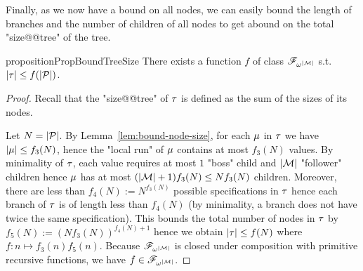 Finally, as we now have a bound on all nodes, we can easily bound the length of branches and the number of children of all nodes to get abound on the total "size@@tree" of the tree.

\begin{restatable}{proposition}{PropBoundTreeSize}
	\label{prop:bound-tree-size}
	There exists a function $f$ of class $\mathscr{F}_{\omega^{|\mathcal{M}|}}$ s.t. $|\tau| \leq f(|\mathcal{P}|)$.
\end{restatable}

\begin{proof}
	Recall that the "size@@tree" of $\tau$ is defined as the sum of the sizes of its nodes. 

	Let $N = |\mathcal{P}|$. 
	By Lemma~\ref{lem:bound-node-size}, for each $\mu$ in $\tau$ we have $|\mu| \leq f_3(N)$, hence the "local run" of $\mu$ contains at most $f_3(N)$ values. By minimality of $\tau$, each value requires at most $1$ "boss" child and $|\mathcal{M}|$ "follower" children hence $\mu$ has at most $(|\mathcal{M}|+1) f_3(N) \leq N f_3(N)$ children. Moreover, there are less than $f_4(N) := N^{f_3(N)}$ possible specifications in $\tau$ hence each branch of $\tau$ is of length less than $f_4(N)$ (by minimality, a branch does not have twice the same specification). This bounds the total number of nodes in $\tau$ by $f_5(N) := (N f_3(N))^{f_4(N) +1}$ hence we obtain $|\tau| \leq f(N)$ where $f: n \mapsto f_3(n) f_5(n)$. Because $\mathscr{F}_{\omega^{|\mathcal{M}|}}$ is closed under composition with primitive recursive functions, we have $f \in \mathscr{F}_{\omega^{|\mathcal{M}|}}$.
\end{proof}


